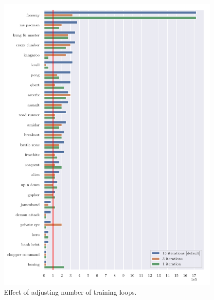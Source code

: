 \begin{figure}
\centering
\includegraphics[width=0.9\columnwidth]{figures/graph_Effect_of_adjusting_number_of_main_loop_iterations.pdf}
\caption{Effect of adjusting number of training loops.} 
\label{fig:adj_loops}
\end{figure}


